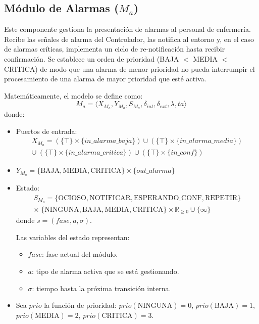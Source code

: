 \subsection{Módulo de Alarmas ($M_a$)}
Este componente gestiona la presentación de alarmas al personal de enfermería. Recibe las señales de alarma del Controlador, las notifica al entorno y, en el caso de alarmas críticas, implementa un ciclo de re-notificación hasta recibir confirmación.
Se establece un orden de prioridad (BAJA $<$ MEDIA $<$ CRITICA) de modo que una alarma de menor prioridad no pueda interrumpir el procesamiento de una alarma de mayor prioridad que esté activa.

Matemáticamente, el modelo se define como:
\[ M_a = \langle X_{M_a}, Y_{M_a}, S_{M_a}, \delta_{int}, \delta_{ext}, \lambda, ta \rangle \]
donde:
\begin{itemize}
    \item Puertos de entrada:
    \begin{gather*}
    X_{M_a} = (\{\top\} \times \{in\_alarma\_baja\})
           \cup (\{\top\} \times \{in\_alarma\_media\}) \\
           \cup\; (\{\top\} \times \{in\_alarma\_critica\})
           \cup (\{\top\} \times \{in\_conf\})
    \end{gather*}
    \item $Y_{M_a} = \{\text{BAJA}, \text{MEDIA}, \text{CRITICA}\} \times \{out\_alarma\}$
    \item Estado:
    \begin{gather*}
    S_{M_a} = \{\text{OCIOSO}, \text{NOTIFICAR}, \text{ESPERANDO\_CONF}, \text{REPETIR}\} \\
           \times\; \{\text{NINGUNA}, \text{BAJA}, \text{MEDIA}, \text{CRITICA}\}
           \times \mathbb{R}_{\geq 0} \cup \{\infty\}
    \end{gather*}
           donde $s = (fase, a, \sigma)$.

    Las variables del estado representan:
    \begin{itemize}
        \item $fase$: fase actual del módulo.
        \item $a$: tipo de alarma activa que se está gestionando.
        \item $\sigma$: tiempo hasta la próxima transición interna.
    \end{itemize}

    \item Sea $prio$ la función de prioridad: $prio(\text{NINGUNA}) = 0$, $prio(\text{BAJA}) = 1$, $prio(\text{MEDIA}) = 2$, $prio(\text{CRITICA}) = 3$.


\end{itemize}
